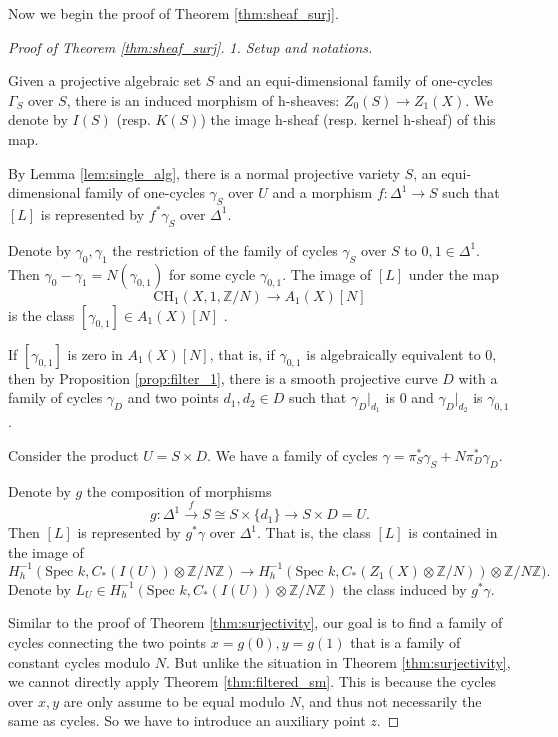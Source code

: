 \documentclass{amsart}
\theoremstyle{definition}
\theoremstyle{remark}
\newcommand{\mbb}{\mathbb}
\newcommand{\ZZ}{\mbb{Z}}
\newcommand{\SP}{\text{Spec }}
\begin{document}
Now we begin the proof of Theorem \ref{thm:sheaf_surj}.
\begin{proof}[Proof of Theorem \ref{thm:sheaf_surj}]
\textit{1. Setup and notations.}

Given a projective algebraic set $S$ and an equi-dimensional family of one-cycles  $\Gamma_S$ over $S$, there is an induced morphism of h-sheaves:
$Z_0(S) \to Z_1(X)$.
We denote by $I(S)$ (resp. $K(S)$) the image h-sheaf (resp. kernel h-sheaf) of this map.




By Lemma \ref{lem:single_alg}, there is a normal projective variety $S$, an equi-dimensional family of one-cycles $\gamma_S$ over $U$ and a morphism $f: \Delta^1 \to S$ such that $[L]$ is represented by $f^*\gamma_S$ over $\Delta^1$.

Denote by $\gamma_0, \gamma_1$ the restriction of the family of cycles $\gamma_S$ over $S$ to $0, 1 \in \Delta^1$. 
Then $\gamma_0-\gamma_1=N(\gamma_{0, 1})$ for some cycle $\gamma_{0, 1}$. 
The image of $[L]$ under the map
\[
\text{CH}_1(X, 1, \ZZ/N) \to A_1(X)[N]
\]
is the class  $[\gamma_{0, 1}]\in A_1(X)[N]$ .

If $[\gamma_{0, 1}]$ is zero in $A_1(X)[N]$, that is, if $\gamma_{0, 1}$ is algebraically equivalent to $0$, 
then by Proposition \ref{prop:filter_1}, 
there is a smooth projective curve $D$ with a family of cycles $\gamma_D$ and two points $d_1, d_2\in D$ such that $\gamma_D|_{d_1}$ is $0$ and $\gamma_D|_{d_2}$ is $\gamma_{0, 1}$. 

Consider the product $U=S \times D$.
We have a family of cycles $\gamma=\pi_S^* \gamma_S+N \pi_D^* \gamma_D$.

Denote by $g$ the composition of morphisms $$g:  \Delta^1 \xrightarrow{f} S \cong S \times \{d_1\}\to S \times D=U.$$ Then  $[L]$ is represented by $g^*\gamma$ over $\Delta^1$.
That is, the class $[L]$ is contained in the image of
$$H^{-1}_h(\SP k, C_*(I(U))\otimes \ZZ/N\ZZ) \to H^{-1}_h(\SP k, C_*(Z_1(X)\otimes\ZZ/N))\otimes \ZZ/N\ZZ).$$
Denote by $L_U \in H^{-1}_h(\SP k, C_*(I(U))\otimes \ZZ/N\ZZ)$ the class induced by $g^*\gamma$.

Similar to the proof of Theorem \ref{thm:surjectivity}, our goal is to find a family of cycles connecting the two points $x=g(0), y=g(1)$ that is a family of constant cycles modulo $N$.
But unlike the situation in Theorem \ref{thm:surjectivity}, we cannot directly apply Theorem \ref{thm:filtered_sm}.
This is because the cycles over $x, y$ are only assume to be equal modulo $N$, and thus not necessarily the same as cycles.
So we have to introduce an auxiliary point $z$.


\end{proof}
\end{document}

